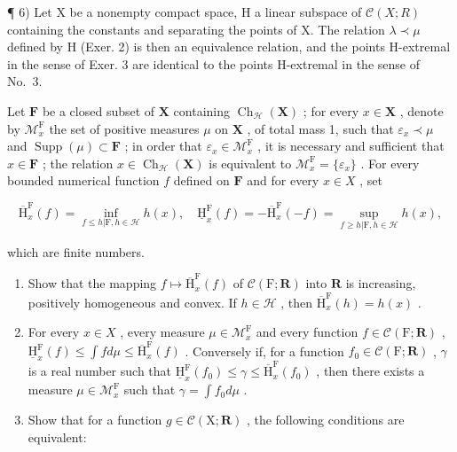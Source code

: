 ¶ 6) Let X be a nonempty compact space, H a linear subspace of \(\mathcal{C}(X;R)\) containing the constants and separating the points of X. The relation \(\lambda \prec \mu\) defined by H (Exer. 2) is then an equivalence relation, and the points H-extremal in the sense of Exer. 3 are identical to the points H-extremal in the sense of No.~3.

Let \(\mathbf{F}\) be a closed subset of \(\mathbf{X}\) containing \(\operatorname{Ch}_{\mathcal{H}}(\mathbf{X})\) ; for every \(x \in \mathbf{X}\) , denote by \(\mathcal{M}_x^{\mathrm{F}}\) the set of positive measures \(\mu\) on \(\mathbf{X}\) , of total mass 1, such that \(\varepsilon_x \prec \mu\) and \(\operatorname{Supp}(\mu) \subset \mathbf{F}\) ; in order that \(\varepsilon_x \in \mathcal{M}_x^{\mathrm{F}}\) , it is necessary and sufficient that \(x \in \mathbf{F}\) ; the relation \(x \in \operatorname{Ch}_{\mathcal{H}}(\mathbf{X})\) is equivalent to \(\mathcal{M}_x^{\mathrm{F}} = \{\varepsilon_x\}\) . For every bounded numerical function \(f\) defined on \(\mathbf{F}\) and for every \(x \in X\) , set

\[
\overline {{\mathrm{H}}} _ {x} ^ {\mathrm{F}} (f) = \inf _ {f \leqslant h | \mathrm{F}, h \in \mathscr {H}} h (x), \quad \underline {{\mathrm{H}}} _ {x} ^ {\mathrm{F}} (f) = - \overline {{\mathrm{H}}} _ {x} ^ {\mathrm{F}} (- f) = \sup _ {f \geqslant h | \mathrm{F}, h \in \mathscr {H}} h (x),
\]

which are finite numbers.

\begin{enumerate}
\def\labelenumi{\alph{enumi})}
\item
  Show that the mapping \(f \mapsto \overline{\mathrm{H}}_x^{\mathrm{F}}(f)\) of \(\mathcal{C}(\mathrm{F};\mathbf{R})\) into \(\mathbf{R}\) is increasing, positively homogeneous and convex. If \(h \in \mathcal{H}\) , then \(\overline{\mathrm{H}}_x^{\mathrm{F}}(h) = h(x)\) .
\item
  For every \(x \in X\) , every measure \(\mu \in \mathcal{M}_x^{\mathrm{F}}\) and every function \(f \in \mathcal{C}(\mathrm{F};\mathbf{R})\) , \(\underline{\mathrm{H}}_x^{\mathrm{F}}(f) \leqslant \int f d\mu \leqslant \overline{\mathrm{H}}_x^{\mathrm{F}}(f)\) . Conversely if, for a function \(f_0 \in \mathcal{C}(\mathrm{F};\mathbf{R})\) , \(\gamma\) is a real number such that \(\underline{\mathrm{H}}_x^{\mathrm{F}}(f_0) \leqslant \gamma \leqslant \overline{\mathrm{H}}_x^{\mathrm{F}}(f_0)\) , then there exists a measure \(\mu \in \mathcal{M}_x^{\mathrm{F}}\) such that \(\gamma = \int f_0 d\mu\) .
\item
  Show that for a function \(g \in \mathcal{C}(\mathrm{X};\mathbf{R})\) , the following conditions are equivalent:
\end{enumerate}

